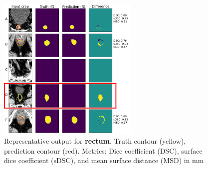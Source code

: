 \documentclass[9pt]{beamer}
\begin{document}
\begin{frame}{}
  \begin{figure}
    \includegraphics[width=0.60\textwidth]{images/prostate_rectum_missed}
    \caption{Representative output for \textbf{rectum}. Truth contour (yellow),
      prediction contour (red).
      Metrics: Dice coefficient (DSC), surface dice coefficient (sDSC), and mean
      surface distance (MSD) in mm}
  \end{figure}
\end{frame}
%
%   
%
\end{document}
